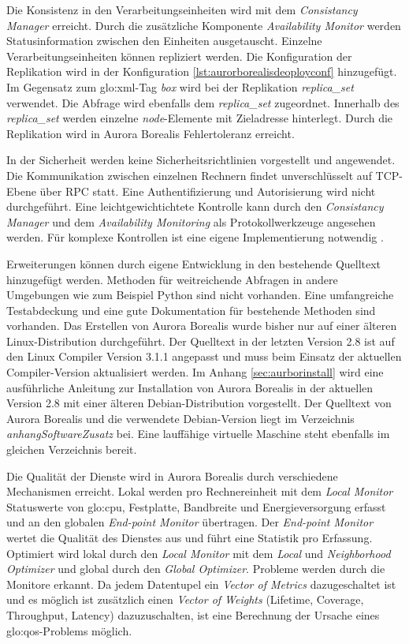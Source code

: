Die Konsistenz in den Verarbeitungseinheiten wird mit dem \textit{Consistancy Manager} erreicht. Durch die zusätzliche Komponente \textit{Availability Monitor} werden Statusinformation zwischen den Einheiten ausgetauscht. Einzelne Verarbeitungseinheiten können repliziert werden. Die Konfiguration der Replikation wird in der Konfiguration \ref{lst:aurorborealisdeoployconf} hinzugefügt. Im Gegensatz zum \gls{glo:xml}-Tag \textit{box} wird bei der Replikation \textit{replica\_set} verwendet. Die Abfrage wird ebenfalls dem \textit{replica\_set} zugeordnet. Innerhalb des \textit{replica\_set} werden einzelne \textit{node}-Elemente mit Zieladresse hinterlegt. Durch die Replikation wird in Aurora Borealis Fehlertoleranz erreicht. 

In der Sicherheit werden keine Sicherheitsrichtlinien vorgestellt und angewendet. Die Kommunikation zwischen einzelnen Rechnern findet unverschlüsselt auf TCP-Ebene über RPC statt. Eine Authentifizierung und Autorisierung wird nicht durchgeführt. Eine leichtgewichtichtete Kontrolle kann durch den \textit{Consistancy Manager} und dem \textit{Availability Monitoring} als Protokollwerkzeuge angesehen werden. Für komplexe Kontrollen ist eine eigene Implementierung notwendig .

Erweiterungen können durch eigene Entwicklung in den bestehende Quelltext hinzugefügt werden. Methoden für weitreichende Abfragen in andere Umgebungen wie zum Beispiel Python sind nicht vorhanden. Eine umfangreiche Testabdeckung und eine gute Dokumentation für bestehende Methoden sind vorhanden. Das Erstellen von Aurora Borealis wurde bisher nur auf einer älteren Linux-Distribution durchgeführt. Der Quelltext in der letzten Version 2.8 ist auf den Linux Compiler Version 3.1.1 angepasst und muss beim Einsatz der aktuellen Compiler-Version aktualisiert werden. Im Anhang \ref{sec:aurborinstall} wird eine ausführliche Anleitung zur Installation von Aurora Borealis in der aktuellen Version 2.8 mit einer älteren Debian-Distribution vorgestellt. Der Quelltext von Aurora Borealis und die verwendete Debian-Version liegt im Verzeichnis \textit{anhangSoftwareZusatz} bei. Eine lauffähige virtuelle Maschine steht ebenfalls im gleichen Verzeichnis bereit.

Die Qualität der Dienste wird in Aurora Borealis durch verschiedene Mechanismen erreicht. Lokal werden pro Rechnereinheit mit dem \textit{Local Monitor} Statuswerte von \gls{glo:cpu}, Festplatte, Bandbreite und Energieversorgung erfasst und an den globalen \textit{End-point Monitor }übertragen. Der \textit{End-point Monitor} wertet die Qualität des Dienstes aus und führt eine Statistik pro Erfassung. Optimiert wird lokal durch den \textit{Local Monitor} mit dem \textit{Local} und \textit{Neighborhood Optimizer} und global durch den \textit{Global Optimizer}. Probleme werden durch die Monitore erkannt. Da jedem Datentupel ein \textit{Vector of Metrics} dazugeschaltet ist und es möglich ist zusätzlich einen \textit{Vector of Weights} (Lifetime, Coverage, Throughput, Latency) dazuzuschalten, ist eine Berechnung der Ursache eines \gls{glo:qos}-Problems möglich. 

